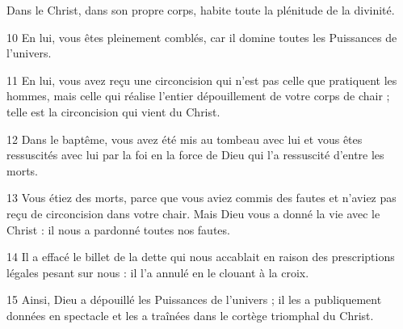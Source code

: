 Dans le Christ, dans son propre corps, habite toute la plénitude de la divinité. 

10 En lui, vous êtes pleinement comblés, car il domine toutes les Puissances de l’univers.

11 En lui, vous avez reçu une circoncision qui n’est pas celle que pratiquent les hommes, mais celle qui réalise l’entier dépouillement de votre corps de chair ; telle est la circoncision qui vient du Christ.

12 Dans le baptême, vous avez été mis au tombeau avec lui et vous êtes ressuscités avec lui par la foi en la force de Dieu qui l’a ressuscité d’entre les morts.

13 Vous étiez des morts, parce que vous aviez commis des fautes et n’aviez pas reçu de circoncision dans votre chair. Mais Dieu vous a donné la vie avec le Christ : il nous a pardonné toutes nos fautes.

14 Il a effacé le billet de la dette qui nous accablait en raison des prescriptions légales pesant sur nous : il l’a annulé en le clouant à la croix.

15 Ainsi, Dieu a dépouillé les Puissances de l’univers ; il les a publiquement données en spectacle et les a traînées dans le cortège triomphal du Christ.